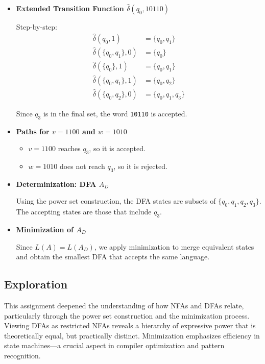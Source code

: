 \documentclass[11pt]{article}
\begin{document}
\begin{itemize}[leftmargin=*]
\item \textbf{Extended Transition Function $\widehat{\delta}(q_0, 10110)$}

Step-by-step:
\begin{align*}
\widehat{\delta}(q_0, 1) &= \{q_0, q_1\} \\
\widehat{\delta}(\{q_0, q_1\}, 0) &= \{q_0\} \\
\widehat{\delta}(\{q_0\}, 1) &= \{q_0, q_1\} \\
\widehat{\delta}(\{q_0, q_1\}, 1) &= \{q_0, q_2\} \\
\widehat{\delta}(\{q_0, q_2\}, 0) &= \{q_0, q_1, q_3\}
\end{align*}

Since $q_3$ is in the final set, the word \texttt{10110} is accepted.

\item \textbf{Paths for $v = 1100$ and $w = 1010$}

\begin{itemize}
    \item $v = 1100$ reaches $q_3$, so it is accepted.
    \item $w = 1010$ does not reach $q_3$, so it is rejected.
\end{itemize}

\item \textbf{Determinization: DFA $A_D$}

Using the power set construction, the DFA states are subsets of $\{q_0, q_1, q_2, q_3\}$. The accepting states are those that include $q_3$.

\item \textbf{Minimization of $A_D$}

Since $L(A) = L(A_D)$, we apply minimization to merge equivalent states and obtain the smallest DFA that accepts the same language.

\end{itemize}

\subsection{Exploration}

This assignment deepened the understanding of how NFAs and DFAs relate, particularly through the power set construction and the minimization process. Viewing DFAs as restricted NFAs reveals a hierarchy of expressive power that is theoretically equal, but practically distinct. Minimization emphasizes efficiency in state machines—a crucial aspect in compiler optimization and pattern recognition.
\end{document}
